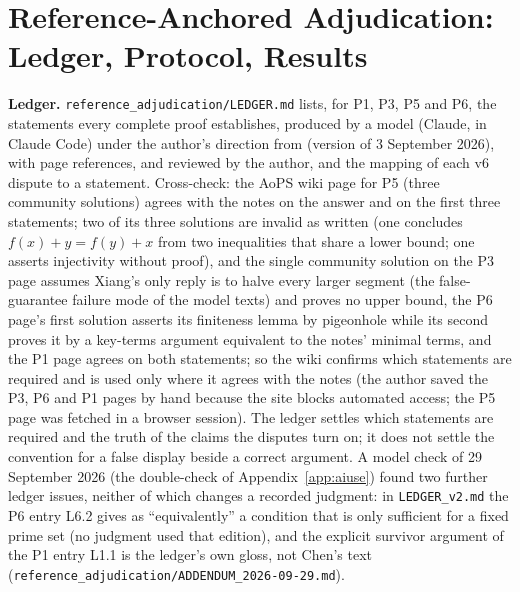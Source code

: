 \section{Reference-Anchored Adjudication: Ledger, Protocol, Results}
\label{app:refadj}
\textbf{Ledger.} \texttt{reference\_adjudication/\allowbreak LEDGER.md} lists, for P1, P3, P5 and P6, the statements every complete proof establishes, produced by a model (Claude, in Claude Code) under the author's direction from \citet{chen2026notes} (version of 3 September 2026), with page references, and reviewed by the author, and the mapping of each v6 dispute to a statement. Cross-check: the AoPS wiki page for P5 (three community solutions) agrees with the notes on the answer and on the first three statements; two of its three solutions are invalid as written (one concludes $f(x)+y=f(y)+x$ from two inequalities that share a lower bound; one asserts injectivity without proof), and the single community solution on the P3 page assumes Xiang's only reply is to halve every larger segment (the false-guarantee failure mode of the model texts) and proves no upper bound, the P6 page's first solution asserts its finiteness lemma by pigeonhole while its second proves it by a key-terms argument equivalent to the notes' minimal terms, and the P1 page agrees on both statements; so the wiki confirms which statements are required and is used only where it agrees with the notes (the author saved the P3, P6 and P1 pages by hand because the site blocks automated access; the P5 page was fetched in a browser session). The ledger settles which statements are required and the truth of the claims the disputes turn on; it does not settle the convention for a false display beside a correct argument. A model check of 29 September 2026 (the double-check of Appendix~\ref{app:aiuse}) found two further ledger issues, neither of which changes a recorded judgment: in \texttt{LEDGER\_v2.md} the P6 entry L6.2 gives as ``equivalently'' a condition that is only sufficient for a fixed prime set (no judgment used that edition), and the explicit survivor argument of the P1 entry L1.1 is the ledger's own gloss, not Chen's text (\texttt{reference\_adjudication/\allowbreak ADDENDUM\_2026-09-29.md}).

